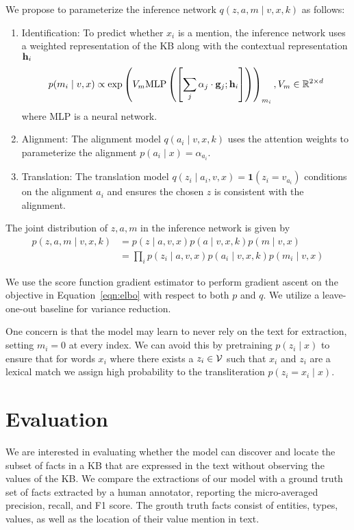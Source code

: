 \documentclass[12pt]{article}
\begin{document}
We propose to parameterize the inference network $q(z,a,m\mid v,x,k)$ as follows:
\begin{enumerate}
\item Identification: To predict whether $x_i$ is a mention,
    the inference network uses a weighted representation of the KB
    along with the contextual representation $\mathbf{h}_i$
    \begin{equation}
    p(m_i \mid v,x) \propto
    \exp\left(V_m
    \textrm{MLP}\left(\left[\sum_j \alpha_j \cdot \mathbf{g}_j; \mathbf{h}_i\right]\right)\right)_{m_i},
    V_m \in \mathbb{R}^{2 \times d}
    \end{equation}
    where MLP is a neural network.
\item Alignment: The alignment model $q(a_i \mid v,x,k)$
    uses the attention weights to parameterize the alignment
    $p(a_i \mid x) = \alpha_{a_i}$.
\item Translation: The translation model
    $q(z_i \mid a_i,v,x) = \mathbf{1}(z_i = v_{a_i})$
    conditions on the alignment $a_i$ and ensures the chosen $z$ is consistent
    with the alignment. 
\end{enumerate}

The joint distribution of $z,a,m$ in the inference network is given by
\begin{equation}
\label{eqn:elbo}
\begin{aligned}
p(z,a,m\mid v,x,k) &= p(z \mid a,v,x)p(a\mid v,x,k)p(m \mid v,x)\\
&= \prod_i p(z_i \mid a,v,x)p(a_i \mid v,x,k)p(m_i \mid v,x)
\end{aligned}
\end{equation}

We use the score function gradient estimator
to perform gradient ascent on the objective
in Equation~\ref{eqn:elbo} with respect to both $p$ and $q$.
We utilize a leave-one-out baseline for variance reduction.

One concern is that the model may learn to never rely on the text for extraction,
setting $m_i = 0$ at every index.
We can avoid this by pretraining $p(z_i \mid x)$ to ensure that for words $x_i$
where there exists a $z_i \in \mathcal{V}$ such that $x_i$ and $z_i$ are a lexical match
we assign high probability to the transliteration $p(z_i = x_i \mid x)$.

\section{Evaluation}
We are interested in evaluating whether the model can discover
and locate the subset of facts in a KB that are expressed in the text
without observing the values of the KB.
We compare the extractions of our model with a ground truth set of facts extracted by a human annotator,
reporting the micro-averaged precision, recall, and F1 score.
The grouth truth facts consist of entities, types, values, as well as the location of their
value mention in text.
\end{document}
